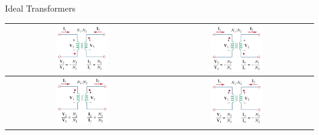 \documentclass{beamer}
\begin{document}
\begin{frame}{Ideal Transformers}

\begin{table}[]
    \centering
    \begin{tabular}{c|c}
        \includegraphics[width=0.35\textwidth]{C13/case811.png}
         &
        \includegraphics[width=0.35\textwidth]{C13/case822.png}
         \\
        \hline
        \includegraphics[width=0.35\textwidth]{C13/case833.png}
         &
        \includegraphics[width=0.35\textwidth]{C13/case844.png}
         \\
    \end{tabular}

\end{table}

\end{frame}
\end{document}
